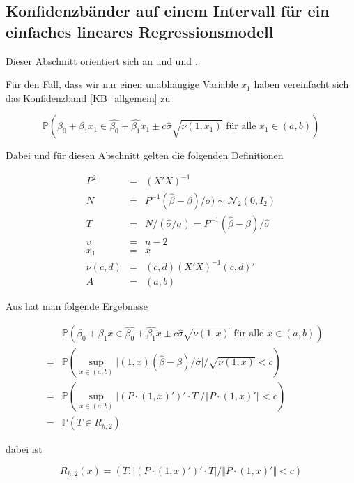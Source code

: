 \documentclass[12pt,a4paper]{article}
\theoremstyle{definition}
\theoremstyle{definition}
\theoremstyle{definition}
\theoremstyle{definition}
\begin{document}
\subsection{Konfidenzbänder auf einem Intervall für ein einfaches lineares Regressionsmodell}
\label{Konfidenzbänder auf einem Intervall für ein einfaches lineares Regressionsmodell}
Dieser Abschnitt orientiert sich an \cite[17-23]{Liu64} und \cite{Liu08} und \cite{Wynn71}.

Für den Fall, dass wir nur einen unabhängige Variable $x_1$ haben vereinfacht sich das Konfidenzband \ref{KB_allgemein} zu

\begin{equation}\label{simple_KB}
\mathbb{P}(\beta_0 + \beta_1 x_1 \in \hat{\beta_0} + \hat{\beta_1} x_1 \pm c \hat{\sigma} \sqrt{\nu(1,x_1)}  \text{ für alle } x_1 \in (a,b) )
\end{equation}

Dabei und für diesen Abschnitt gelten die folgenden Definitionen

\begin{eqnarray*}
P^2 &=& (X'X)^{-1} \\
N &=& P^{-1} (\hat{\beta} - \beta)/\sigma) \sim \mathscr{N}_{2}(0,I_2) \\
T &=& N / (\hat{\sigma} / \sigma) = P^{-1} (\hat{\beta}-\beta) / \hat{\sigma} \\
v &=& n-2 \\
x_1 &=& x \\
\nu(c,d) &=& (c,d) (X'X)^{-1} (c,d)' \\
A &=&(a,b)
\end{eqnarray*}

Aus \cite[19-20]{Liu64} hat man folgende Ergebnisse

\begin{eqnarray*}
&& \mathbb{P}(\beta_0 + \beta_1 x \in \hat{\beta_0} + \hat{\beta_1} x \pm c \hat{\sigma} \sqrt{\nu(1,x)}  \text{ für alle } x \in (a,b))  \\
&=& \mathbb{P} (\sup_{x \in (a,b)} \vert (1,x) ( \hat{\beta} - \beta ) / \hat{\sigma} \vert / \sqrt{\nu(1,x)} < c) \\
&=& \mathbb{P} (\sup_{x \in (a,b)} \vert (P \cdot (1,x)')' \cdot T \vert / \Vert P \cdot (1,x)' \Vert < c) \\
&=& \mathbb{P} (T \in R_{h,2})
\end{eqnarray*}

dabei ist

\begin{equation*}
R_{h,2}(x) = ( T : \vert (P \cdot (1,x)' )' \cdot T \vert / \Vert P \cdot (1,x)' \Vert < c)
\end{equation*}
\end{document}
